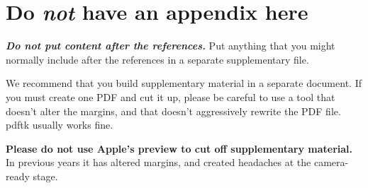 \documentclass{article}
\begin{document}





\appendix
\section{Do \emph{not} have an appendix here}

\textbf{\emph{Do not put content after the references.}}
%
Put anything that you might normally include after the references in a separate
supplementary file.

We recommend that you build supplementary material in a separate document.
If you must create one PDF and cut it up, please be careful to use a tool that
doesn't alter the margins, and that doesn't aggressively rewrite the PDF file.
pdftk usually works fine. 

\textbf{Please do not use Apple's preview to cut off supplementary material.} In
previous years it has altered margins, and created headaches at the camera-ready
stage. 
\end{document}
